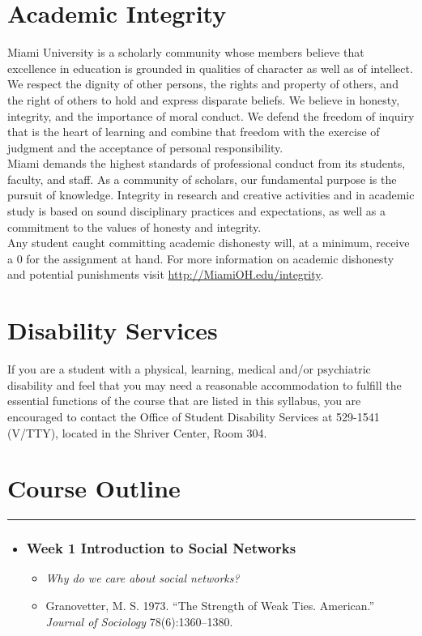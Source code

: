 \documentclass[11pt]{article}
\newenvironment{courseday}[2]{
\begin{itemize}
	\item[] \subsubsection*{\textbf{#1} #2}
	\begin{itemize}
}{
\end{itemize}
\end{itemize}
}
\begin{document}
\hrulefill  

\section*{Academic Integrity} 
Miami University is a scholarly community whose members believe that excellence in education is grounded in qualities of character as well as of intellect. We respect the dignity of other persons, the rights and property of others, and the right of others to hold and express disparate beliefs. We believe in honesty, integrity, and the importance of moral conduct. We defend the freedom of inquiry that is the heart of learning and combine that freedom with the exercise of judgment and the acceptance of personal responsibility.\\

Miami demands the highest standards of professional conduct from its students, faculty, and staff.  As a community of scholars, our fundamental purpose is the pursuit of knowledge.  Integrity in research and creative activities and in academic study is based on sound disciplinary practices and expectations, as well as a commitment to the values of honesty and integrity. \\

Any student caught committing academic dishonesty will, at a minimum, receive a 0 for the assignment at hand. For more information on academic dishonesty and potential punishments visit \url{http://MiamiOH.edu/integrity}. \\


\section*{Disability Services} 
If you are a student with a physical, learning, medical and/or psychiatric disability and feel that you may need a reasonable accommodation to fulfill the essential functions of the course that are listed in this syllabus, you are encouraged to contact the Office of Student Disability Services at 529-1541 (V/TTY), located in the Shriver Center, Room 304. \\ 


\section*{\Large Course Outline}\hrule 
\vspace{.25cm}

\begin{courseday}{Week 1}{Introduction to Social Networks}
	\item[] \textit{Why do we care about social networks?}
	\item[] Granovetter, M. S. 1973. ``The Strength of Weak Ties. American.'' \textit{Journal of Sociology} 78(6):1360–1380.
\end{courseday}
\end{document}

